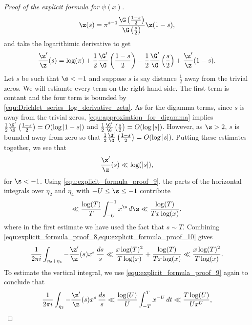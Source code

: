 \begin{proof}[Proof of the explicit formula for $\psi(x)$]
        \[
          \z(s) = \pi^{s-1}\frac{\G\left(\frac{1-s}{2}\right)}{\G\left(\frac{s}{2}\right)}\z(1-s),
        \]
        and take the logarithimic derivative to get
        \[
          \frac{\z'}{\z}(s) = \log(\pi)+\frac{1}{2}\frac{\G'}{\G}\left(\frac{1-s}{2}\right)-\frac{1}{2}\frac{\G'}{\G}\left(\frac{s}{2}\right)+\frac{\z'}{\z}(1-s).
        \]
        Let $s$ be such that $\s < -1$ and suppose $s$ is say distance $\frac{1}{2}$ away from the trivial zeros. We will estiamte every term on the right-hand side. The first term is contant and the four term is bounded by \cref{equ:Drichlet_series_log_derivative_zeta}. As for the digamma terms, since $s$ is away from the trivial zeros, \cref{equ:approximtion_for_digamma} implies $\frac{1}{2}\frac{\G'}{\G}\left(\frac{1-s}{2}\right) = O(\log|1-s|)$ and $\frac{1}{2}\frac{\G'}{\G}\left(\frac{s}{2}\right) = O(\log|s|)$. However, as $\s > 2$, $s$ is bounded away from zero so that $\frac{1}{2}\frac{\G'}{\G}\left(\frac{1-s}{2}\right) = O(\log|s|)$. Putting these estimates together, we see that
        \begin{equation}\label{equ:explicit_formula_proof_9}
          \frac{\z'}{\z}(s) \ll \log(|s|),
        \end{equation}
        for $\s < -1$. Using \cref{equ:explicit_formula_proof_9}, the parts of the horizontal integrals over $\eta_{2}$ and $\eta_{4}$ with $-U \le \s \le -1$ contribute
        \begin{equation}\label{equ:explicit_formula_proof_10}
          \ll \frac{\log(T)}{T}\int_{-U}^{-1}x^{\s}\,d\s \ll \frac{\log(T)}{Tx\log(x)},
        \end{equation}
        where in the first estimate we have used the fact that $s \sim T$. Combining \cref{equ:explicit_formula_proof_8,equ:explicit_formula_proof_10} gives
        \begin{equation}\label{equ:explicit_formula_proof_11}
          \frac{1}{2\pi i}\int_{\eta_{2}+\eta_{4}}-\frac{\z'}{\z}(s)x^{s}\,\frac{ds}{s} \ll \frac{x\log(T)^{2}}{T\log(x)}+\frac{\log(T)}{Tx\log(x)} \ll \frac{x\log(T)^{2}}{T\log(x)}.
        \end{equation}
        To estimate the vertical integral, we use \cref{equ:explicit_formula_proof_9} again to conclude that
        \begin{equation}\label{equ:explicit_formula_proof_12}
          \frac{1}{2\pi i}\int_{\eta_{3}}-\frac{\z'}{\z}(s)x^{s}\,\frac{ds}{s} \ll \frac{\log(U)}{U}\int_{-T}^{T}x^{-U}\,dt \ll \frac{T\log(U)}{Ux^{U}},
        \end{equation}

\end{proof}
